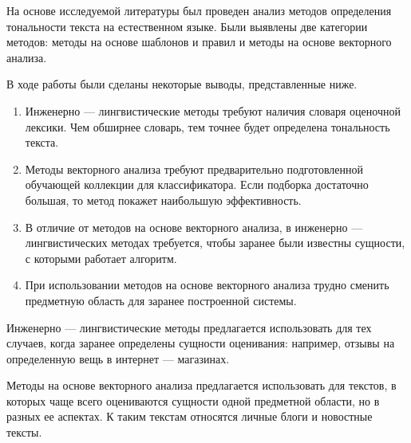На основе исследуемой литературы был проведен анализ методов определения тональности текста на естественном языке. Были выявлены две категории методов: методы на основе шаблонов и правил и методы на основе векторного анализа. 

В ходе работы были сделаны некоторые выводы, представленные ниже.
\begin{enumerate}
	\item Инженерно --- лингвистические методы требуют наличия словаря оценочной лексики. Чем обширнее словарь, тем точнее будет определена тональность текста.
	\item Методы векторного анализа требуют предварительно подготовленной обучающей коллекции для классификатора. Если подборка достаточно большая, то метод покажет наибольшую эффективность. 
	\item В отличие от методов на основе векторного анализа, в инженерно --- лингвистических методах требуется, чтобы заранее были известны сущности, с которыми работает алгоритм.  
	\item При использовании методов на основе векторного анализа трудно сменить предметную область для заранее построенной системы. 
\end{enumerate} 


Инженерно --- лингвистические методы предлагается использовать для тех случаев, когда заранее определены сущности оценивания: например, отзывы на определенную вещь в интернет --- магазинах. 

Методы на основе векторного анализа предлагается использовать для текстов, в которых чаще всего оцениваются сущности одной предметной области, но в разных ее аспектах. К таким текстам относятся личные блоги и новостные тексты. 